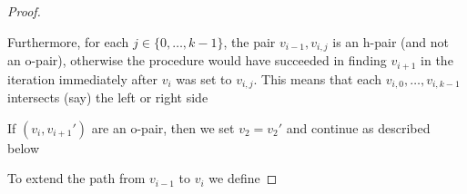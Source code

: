 \documentclass[lotsofwhite]{patmorin}
\DeclareMathOperator{\spn}{span}
\begin{document}
\begin{proof}
\begin{enumerate}
     Furthermore, for each $j\in\{0,\ldots,k-1\}$, the pair
     $v_{i-1},v_{i,j}$ is an h-pair (and not an o-pair), otherwise the
     procedure would have succeeded in finding $v_{i+1}$ in the iteration
     immediately after $v_i$ was set to $v_{i,j}$.  This means that each
     $v_{i,0},\ldots,v_{i,k-1}$ intersects (say) the left or right side

  \end{enumerate}


  If $(v_i,v_{i+1}')$ are an o-pair, then we set $v_2=v_2'$ and continue
  as described below



   To extend the path from $v_{i-1}$ to $v_{i}$ we define
%
%
%

\end{proof}
\end{document}

